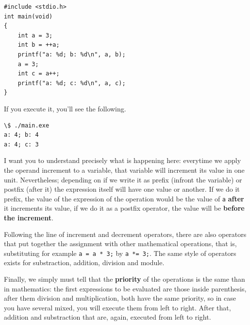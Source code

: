 \documentclass[a4paper]{article}
\begin{document}
\noindent
\begin{minipage}[H]{\linewidth}
\mbox{}
\begin{lstlisting}[style=C, caption={Increment and decrement operators},
label={lst:prefixAndPostfixOperators}]
#include <stdio.h>
int main(void)
{
    int a = 3;
    int b = ++a;
    printf("a: %d; b: %d\n", a, b);
    a = 3;
    int c = a++;
    printf("a: %d; c: %d\n", a, c);
}
\end{lstlisting}
\end{minipage}

If you execute it, you'll see the following.

\noindent
\begin{minipage}[H]{\linewidth}
\mbox{}
\begin{lstlisting}[style=terminalStyle]
\$ ./main.exe
a: 4; b: 4
a: 4; c: 3
\end{lstlisting}
\end{minipage}

I want you to understand precisely what is happening here: everytime we apply
the operand increment to a variable, that variable will increment
its value in one unit. Nevertheless; depending on if we write it as prefix
(infront the variable) or postfix (after it) the expression itself will have one
value or another. If we do it prefix, the value
of the expression of the operation
would be the value of \verb!a! \textbf{after} it increments its value, if we
do it as a postfix operator, the value will be \textbf{before the increment}.

Following the line of increment and decrement operators, there are also
operators that put together the assignment with other mathematical operations,
that is, substituting for example \lstinline[style=C]!a = a * 3;! by
\lstinline[style=C]!a *= 3;!. The same style of operators exists for
substraction, addition, division and module.

Finally, we simply must tell that the \textbf{priority} of the operations
is the same than in mathematics: the first expressions to be evaluated are those
inside parenthesis, after them division and multiplication, both have
the same priority, so in case you have several mixed, you will execute them
from left to right. After that, addition and substraction that are, again,
executed from left to right.
\end{document}
